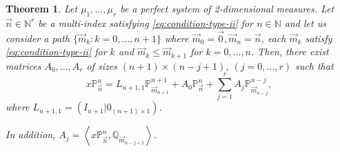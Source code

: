 \documentclass[12pt,a4]{report}
\theoremstyle{plain}
\newtheorem{theorem}{Theorem}[section]
\newcommand{\N}[0]{\mathbb{N}}
\newcommand{\prodesc}[2]{\left\langle #1 , #2 \right\rangle}
\begin{document}
\begin{theorem} 
    \label{th:neighbours}
    Let $\mu_1,\dots,\mu_r$ be a perfect system of 2-dimensional measures. Let $\vec n\in \N^r$ be a multi-index satisfying \eqref{eq:condition-type-ii} for $n\in\N$ and let us consider a path $\{\overrightarrow{m}_k:k=0,\dots,n+1\}$ where $\overrightarrow{m}_0=\vec 0, \overrightarrow{m}_n = \vec n$, each $\overrightarrow{m}_k$ satisfy \eqref{eq:condition-type-ii} for $k$ and $\overrightarrow{m}_k \leq \overrightarrow m_{k+1}$ for $k=0,\dots,n$. Then, there exist matrices $A_0,\dots,A_r$ of sizes $(n+1)\times(n-j+1)$,  $(j=0,\dots,r)$ such that
    \begin{equation}
        \label{eq:nearest-neighbour}
        x\mathbb P_{\vec n}^n = L_{{n+1},1} \mathbb P_{\overrightarrow{m}_{n+1}}^{n+1} + A_0 \mathbb P_{\vec n}^n + \sum_{j=1}^r A_j \mathbb P_{\overrightarrow{m}_{n-j}}^{n-j},
    \end{equation}
    where $L_{n+1,1}=(I_{n+1}|0_{(n+1)\times 1})$.

    In addition, $A_j = \prodesc{x\mathbb P_{\vec n}^n}{\mathbb Q_{\overrightarrow{m}_{n-j+1}}}$.
\end{theorem}
\end{document}
